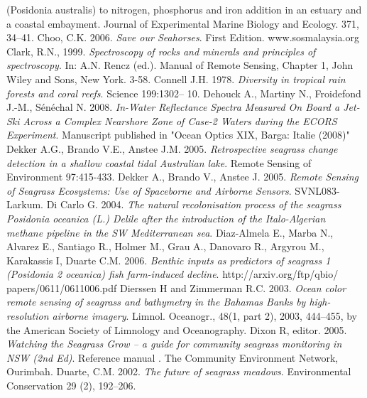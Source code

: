 \documentclass[10pt, a4paper]{article}
\begin{document}
\begin{thebibliography}{999}
{(Posidonia australis) to nitrogen, phosphorus and iron addition in an estuary and a coastal
embayment}. Journal of Experimental Marine Biology and Ecology. 371, 34–41. \pageref{Cambridge09}
Choo, C.K. 2006. \emph{Save our Seahorses}. First Edition. www.sosmalaysia.org \pageref{Choo06}
Clark, R.N., 1999. \emph{Spectroscopy of rocks and minerals and principles of spectroscopy}.
In: A.N. Rencz (ed.). Manual of Remote Sensing, Chapter 1, John Wiley and Sons, New
York. 3-58. \pageref{Choo06}
Connell J.H. 1978. \emph{Diversity in tropical rain forests and coral reefs}. Science 199:1302–
10. \pageref{Connell78}
Dehouck A., Martiny N., Froidefond J.-M., Sénéchal N. 2008. \emph{In-Water Reflectance
Spectra Measured On Board a Jet-Ski Across a Complex Nearshore Zone of Case-2 Waters
during the ECORS Experiment}. Manuscript published in "Ocean Optics XIX, Barga: Italie
(2008)" \pageref{Dehouck08}
Dekker A.G., Brando V.E., Anstee J.M. 2005. \emph{Retrospective seagrass change detection
in a shallow coastal tidal Australian lake}. Remote Sensing of Environment 97:415-433. \pageref{Dekker05a}
Dekker A., Brando V., Anstee J. 2005. \emph{Remote Sensing of Seagrass Ecosystems: Use of
Spaceborne and Airborne Sensors}. SVNL083-Larkum. \pageref{Dekker05b}
Di Carlo G. 2004. \emph{The natural recolonisation process of the seagrass Posidonia
oceanica (L.) Delile after the introduction of the Italo-Algerian methane pipeline in the SW
Mediterranean sea}. 
\pageref{DiCarlo04}
Diaz-Almela E., Marba N., Alvarez E., Santiago R., Holmer M., Grau A., Danovaro R.,
Argyrou M., Karakassis I, Duarte C.M. 2006. \emph{Benthic inputs as predictors of seagrass 1
(Posidonia 2 oceanica) fish farm-induced decline}. http://arxiv.org/ftp/qbio/
papers/0611/0611006.pdf \pageref{Diaz-Almela06}
Dierssen H and Zimmerman R.C. 2003. \emph{Ocean color remote sensing of seagrass and
bathymetry in the Bahamas Banks by high-resolution airborne imagery}. Limnol. Oceanogr.,
48(1, part 2), 2003, 444–455, by the American Society of Limnology and Oceanography. \pageref{Dierssen03}
Dixon R, editor. 2005. \emph{Watching the Seagrass Grow – a guide for community seagrass
monitoring in NSW (2nd Ed)}. Reference manual . The Community Environment Network,
Ourimbah. \pageref{Dixon05}
Duarte, C.M. 2002. \emph{The future of seagrass meadows}. Environmental Conservation 29
(2), 192–206. \pageref{Duarte02}

\end{thebibliography}
\end{document}
